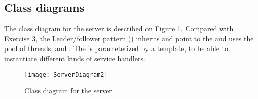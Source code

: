 \documentclass[Main]{subfiles}
\begin{document}
\subsection{Class diagrams}
The class diagram for the server is described on Figure \ref{fig:serverClass}. 
Compared with Exercise 3, the Leader/follower pattern () inherits and point to the  and uses the pool of threads, and .
The  is parameterized by a template,  to be able to instantiate different kinds of service handlers.

\begin{figure}[hbtp]
\centering
\texttt{[image: ServerDiagram2]}
\caption{Class diagram for the server}
\label{fig:serverClass}
\end{figure}
\end{document}
